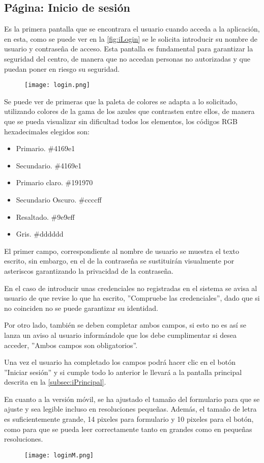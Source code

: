 \subsection{Página: Inicio de sesión}\label{subsec:iLogin}
Es la primera pantalla que se encontrara el usuario cuando acceda a la aplicación, en esta, como se puede ver en la \autoref{fig:iLogin} se le solicita introducir su nombre de usuario y contraseña de acceso. Esta pantalla es fundamental para garantizar la seguridad del centro, de manera que no accedan personas no autorizadas y que puedan poner en riesgo su seguridad.
\begin{figure}[H]
	{\texttt{[image: login.png]}}
\end{figure}
Se puede ver de primeras que la paleta de colores se adapta a lo solicitado, utilizando colores de la gama de los azules que contrasten entre ellos, de manera que se pueda visualizar sin dificultad todos los elementos, los códigos RGB hexadecimales elegidos son:
\begin{itemize}
	\item Primario. \#4169e1
	\item Secundario. \#4169e1
	\item Primario claro. \#191970
	\item Secundario Oscuro. \#ccccff
	\item Resaltado. \#9e9eff
	\item Gris. \#dddddd
\end{itemize}
El primer campo, correspondiente al nombre de usuario se muestra el texto escrito, sin embargo, en el de la contraseña se sustituirán visualmente por asteriscos garantizando la privacidad de la contraseña.

En el caso de introducir unas credenciales no registradas en el sistema se avisa al usuario de que revise lo que ha escrito, ''Compruebe las credenciales'', dado que si no coinciden no se puede garantizar su identidad.

Por otro lado, también se deben completar ambos campos, si esto no es así se lanza un aviso al usuario informándole que los debe cumplimentar si desea acceder, ''Ambos campos son obligatorios''.

Una vez el usuario ha completado los campos podrá hacer clic en el botón ''Iniciar sesión'' y si cumple todo lo anterior le llevará a la pantalla principal descrita en la \autoref{subsec:iPrincipal}.

En cuanto a la versión móvil, se ha ajustado el tamaño del formulario para que se ajuste y sea legible incluso en resoluciones pequeñas. Además, el tamaño de letra es suficientemente grande, 14 pixeles para formulario y 10 pixeles para el botón, como para que se pueda leer correctamente tanto en grandes como en pequeñas resoluciones.
\begin{figure}[H]
	{\texttt{[image: loginM.png]}}
\end{figure}

